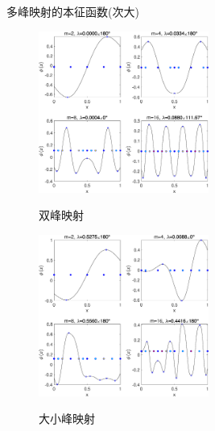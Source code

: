 \documentclass{beamer}
\begin{document}
	\begin{frame}{多峰映射的本征函数(次大)}
		\begin{figure}
			\begin{minipage}{0.45\linewidth}
				\centerline{\includegraphics[width=2.2in]{images/08a-Tents52_eigen_Gauss_n1000_m2-4-8-16_d0.eps}}
				\centerline{双峰映射}
			\end{minipage}
			\hfill
			\begin{minipage}{0.45\linewidth}
				\centerline{\includegraphics[width=2.2in]{images/08b-Tents5l2_eigen_Gauss_n1000_m2-4-8-16_d0.eps}}
				\centerline{大小峰映射}
			\end{minipage}
		\end{figure}
	\end{frame}
	
\end{document}
